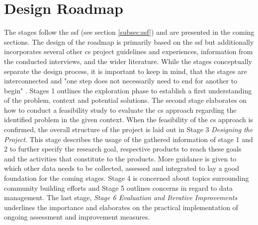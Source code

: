 
\section{Design Roadmap}
The stages follow the \acrlong{ssf} (see section \ref*{subsec:ssf}) and are presented in the coming sections. The design of the roadmap is primarily based on the \acrshort{ssf} but additionally incorporates several other \acrshort{cs} project guidelines and experiences, information from the conducted interviews, and the wider literature. While the stages conceptually separate the design process, it is important to keep in mind, that the stages are interconnected and "one step does not necessarily need to end for another to begin" \autocite[2]{fraislCitizenScienceEnvironmental2022}. Stages 1 outlines the exploration phase to establish a first understanding of the problem, context and potential solutions. The second stage elaborates on how to conduct a feasibility study to evaluate the \acrshort{cs} approach regarding the identified problem in the given context. When the feasibility of the \acrshort{cs} approach is confirmed, the overall structure of the project is laid out in Stage 3 \textit{Designing the Project}. This stage describes the usage of the gathered information of stage 1 and 2 to further specify the research goal, respective products to reach these goals and the activities that constitute to the products. More guidance is given to which other data needs to be collected, assessed and integrated to lay a good foundation for the coming stages. Stage 4 is concerned about topics surrounding community building efforts and Stage 5 outlines concerns in regard to data management. The last stage, \textit{Stage 6 Evaluation and Iterative Improvements} underlines the importance and elaborates on the practical implementation of ongoing assessment and improvement measures.

